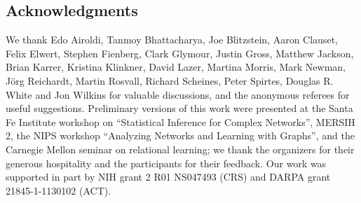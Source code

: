\documentclass{article}
\begin{document}
\begin{multicols}{2}
\subsection*{Acknowledgments}

We thank Edo Airoldi, Tanmoy Bhattacharya, Joe Blitzstein, Aaron Clauset, Felix
Elwert, Stephen Fienberg, Clark Glymour, Justin Gross, Matthew Jackson, Brian
Karrer, Kristina Klinkner, David Lazer, Martina Morris, Mark Newman, J{\"o}rg
Reichardt, Martin Rosvall, Richard Scheines, Peter Spirtes, Douglas R. White
and Jon Wilkins for valuable discussions, and the anonymous referees for useful
suggestions.  Preliminary versions of this work were presented at the Santa Fe
Institute workshop on ``Statistical Inference for Complex Networks'', MERSIH 2,
the NIPS workshop ``Analyzing Networks and Learning with Graphs'', and the
Carnegie Mellon seminar on relational learning; we thank the organizers for
their generous hospitality and the participants for their feedback.  Our work
was supported in part by NIH grant 2 R01 NS047493 (CRS) and DARPA grant
21845-1-1130102 (ACT).




\end{multicols}
\end{document}
